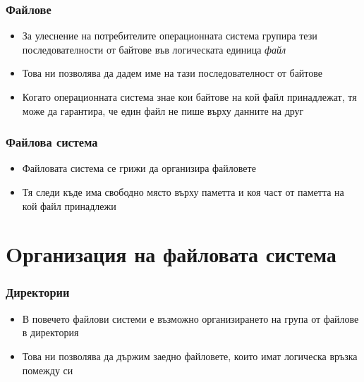 \documentclass[ignorenonframetext, hyperref=unicode]{beamer}
\begin{document}
\begin{frame}
\frametitle{Файлове}
\begin{itemize}
  \item За улеснение на потребителите операционната система групира тези последователности от байтове във логическата единица {\em файл}
  \item Това ни позволява да дадем име на тази последователност от байтове
  \item Когато операционната система знае кои байтове на кой файл принадлежат, тя може да гарантира, че един файл не пише върху данните на друг
\end{itemize}
\end{frame}

\begin{frame}
\frametitle{Файлова система}
\begin{itemize}
  \item Файловата система се грижи да организира файловете
  \item Тя следи къде има свободно място върху паметта и коя част от паметта на кой файл принадлежи
\end{itemize}
\end{frame}


\section{Oрганизация на файловата система}


\begin{frame}
\frametitle{Директории}
\begin{itemize}
  \item В повечето файлови системи е възможно организирането на група от файлове в директория
  \item Това ни позволява да държим заедно файловете, които имат логическа връзка помежду си
\end{itemize}
\end{frame}
\end{document}
